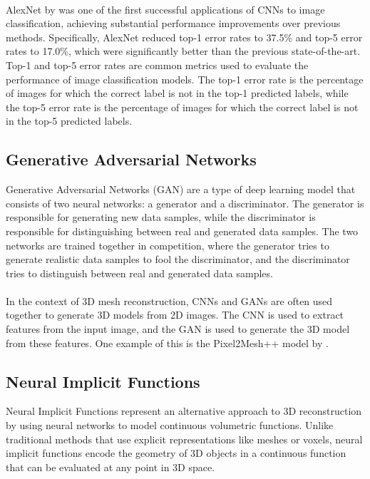\paragraph{}
AlexNet by \textcite{krizhevsky_imagenet_2012} was one of the first successful applications of CNNs to image classification, achieving substantial performance improvements over previous methods. Specifically, AlexNet reduced top-1 error rates to 37.5\% and top-5 error rates to 17.0\%, which were significantly better than the previous state-of-the-art.
Top-1 and top-5 error rates are common metrics used to evaluate the performance of image classification models. The top-1 error rate is the percentage of images for which the correct label is not in the top-1 predicted labels, while the top-5 error rate is the percentage of images for which the correct label is not in the top-5 predicted labels.

\subsection{Generative Adversarial Networks} \label{section:gans}
Generative Adversarial Networks (GAN) \autocite{goodfellow_generative_2014} are a type of deep learning model that consists of two neural networks: a generator and a discriminator. The generator is responsible for generating new data samples, while the discriminator is responsible for distinguishing between real and generated data samples. The two networks are trained together in competition, where the generator tries to generate realistic data samples to fool the discriminator, and the discriminator tries to distinguish between real and generated data samples.
\paragraph{}
In the context of 3D mesh reconstruction, CNNs and GANs are often used together to generate 3D models from 2D images. The CNN is used to extract features from the input image, and the GAN is used to generate the 3D model from these features. One example of this is the Pixel2Mesh++ model by \textcite{wen_pixel2mesh_2019}.

\subsection{Neural Implicit Functions} \label{section:nif}
Neural Implicit Functions represent an alternative approach to 3D reconstruction by using neural networks to model continuous volumetric functions. Unlike traditional methods that use explicit representations like meshes or voxels, neural implicit functions encode the geometry of 3D objects in a continuous function that can be evaluated at any point in 3D space.


